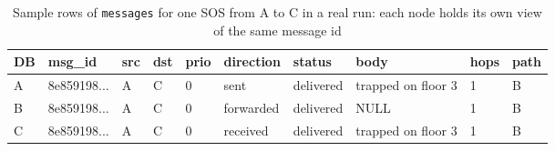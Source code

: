 \begin{table}[htbp]
\caption{Sample rows of \texttt{messages} for one SOS from A to C in a real run: each node holds its own view of the same message id}
\label{tab:samples}
\footnotesize
\setlength{\tabcolsep}{3pt}
\begin{tabular}{@{}llllllllll@{}}
\toprule
\textbf{DB} & \textbf{msg\_id} & \textbf{src} & \textbf{dst} & \textbf{prio} & \textbf{direction} & \textbf{status} & \textbf{body} & \textbf{hops} & \textbf{path} \\ \midrule
A & 8e859198... & A & C & 0 & sent & delivered & trapped on floor 3 & 1 & B \\
B & 8e859198... & A & C & 0 & forwarded & delivered & NULL & 1 & B \\
C & 8e859198... & A & C & 0 & received & delivered & trapped on floor 3 & 1 & B \\
\bottomrule
\end{tabular}
\end{table}
